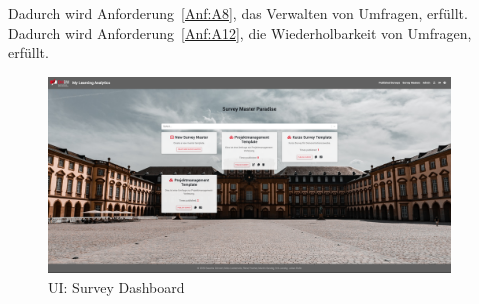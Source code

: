 Dadurch wird Anforderung~\ref{Anf:A8}, das Verwalten von Umfragen, erfüllt. \newline
Dadurch wird Anforderung~\ref{Anf:A12}, die Wiederholbarkeit von Umfragen, erfüllt.

\begin{figure}[!htb]
	\centering
	\includegraphics[width=0.95\textwidth, keepaspectratio]{img/client/SurveyMaster.png}
	\captionsetup{justification=centering, format=plain}
	\caption[\acf{UI}: Survey Dashboard]{\acf{UI}: Survey Dashboard \\ \quelleScreenshot}
	\label{fig:SurveyMasterDashboard}
\end{figure}